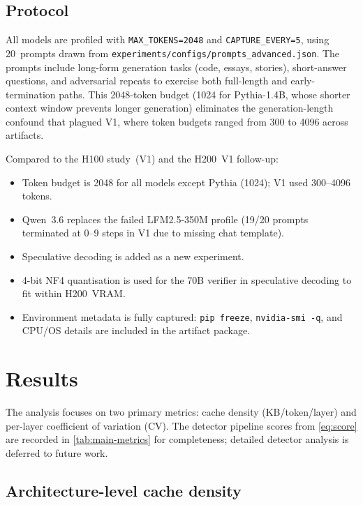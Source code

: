 \documentclass[11pt,a4paper]{article}
\newcommand{\code}[1]{\texttt{#1}}
\begin{document}
\subsection{Protocol}
\label{sec:setup:protocol}

All models are profiled with \code{MAX\_TOKENS=2048} and
\code{CAPTURE\_EVERY=5}, using 20~prompts drawn from
\texttt{experiments/configs/prompts\_advanced.json}.
The prompts include long-form generation tasks (code, essays,
stories), short-answer questions, and adversarial repeats to
exercise both full-length and early-termination paths.
This 2048-token budget (1024 for Pythia-1.4B, whose shorter
context window prevents longer generation) eliminates the
generation-length confound that plagued V1, where token budgets
ranged from 300 to 4096 across artifacts.

Compared to the H100 study~(V1) and the H200~V1 follow-up:
\begin{itemize}\setlength\itemsep{1pt}
  \item Token budget is 2048 for all models except Pythia
    (1024); V1 used 300--4096 tokens.
  \item Qwen~3.6 replaces the failed LFM2.5-350M profile
    (19/20 prompts terminated at 0--9 steps in V1 due to
    missing chat template).
  \item Speculative decoding is added as a new experiment.
  \item 4-bit NF4 quantisation is used for the 70B verifier
    in speculative decoding to fit within H200~VRAM.
  \item Environment metadata is fully captured: \code{pip freeze},
    \code{nvidia-smi -q}, and CPU/OS details are included in
    the artifact package.
\end{itemize}

\section{Results}
\label{sec:results}

The analysis focuses on two primary metrics: cache density
(KB/token/layer) and per-layer coefficient of variation (CV).
The detector pipeline scores from \cref{eq:score} are recorded
in \cref{tab:main-metrics} for completeness; detailed detector
analysis is deferred to future work.

\subsection{Architecture-level cache density}
\label{sec:results:density}
\end{document}
